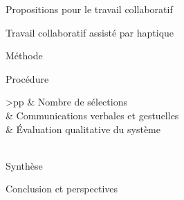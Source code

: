 \documentclass[myfrancais]{mythesis}
\begin{document}
\begin{mypart}{Propositions pour le travail collaboratif}
\begin{mychapter}{Travail collaboratif assisté par haptique}
\begin{mysection}{Méthode}
\begin{mysubsection}{Procédure}
\begin{mytable}
\begin{mytabular}{>{\bfseries}p{\expfourfirstcolumn}p{\expfoursecondcolumn}}
							                                          &  Nombre de sélections                                           \\
							                                          &  Communications verbales et gestuelles                          \\
							                                          &  Évaluation qualitative du système                              \\
							\mymiddlerule[\heavyrulewidth]
							 \\
							\mybottomrule
						\end{mytabular}
					\end{mytable}
				\end{mysubsection}
			\end{mysection}
		\end{mychapter}
	\end{mypart}
	\begin{mypart}{Synthèse}
		\begin{mychapter}{Conclusion et perspectives}
		\end{mychapter}
	\end{mypart}

	\myglossary
\end{document}
